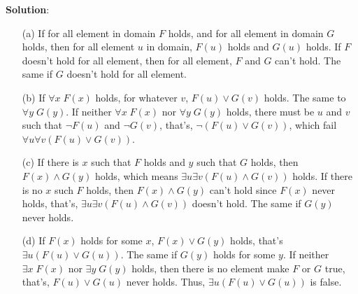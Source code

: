 \documentclass{ctexart}
\begin{document}
\textbf{Solution}:
\begin{itemize}

\item[(a)] If for all element in domain $F$ holds, and for all element in domain $G$ holds, then for all element $u$
in domain, $F(u)$ holds and $G(u)$ holds. If $F$ doesn't hold for all element,
then for all element, $F$ and $G$ can't hold. The same if $G$ doesn't hold for all element.

\item[(b)] If $\forall x\; F(x)$ holds, for whatever $v$, $F(u) \lor G(v)$ holds. The same to $\forall y\; G(y)$.
If neither $\forall x\; F(x)$ nor $\forall y\; G(y)$ holds, there must be $u$ and $v$ such that
$\lnot F(u)$ and $\lnot G(v)$, that's, $\lnot (F(u) \lor G(v))$, which fail $\forall u\forall v(F(u) \lor G(v))$.

\item[(c)] If there is $x$ such that $F$ holds and $y$ such that $G$ holds, then $F(x) \land G(y)$ holds, which means
$\exists u\exists v(F(u) \land G(v))$ holds. If there is no $x$ such $F$ holds, then $F(x) \land G(y)$ can't hold
since $F(x)$ never holds, that's, $\exists u\exists v(F(u) \land G(v))$ doesn't hold. The same if $G(y)$ never holds.

\item[(d)] If $F(x)$ holds for some $x$, $F(x) \lor G(y)$ holds, that's $\exists u(F(u) \lor G(u))$. The same if $G(y)$ holds
for some $y$. If neither $\exists x\; F(x)$ nor $\exists y\; G(y)$ holds, then there is no element make $F$ or $G$ true,
that's, $F(u) \lor G(u)$ never holds. Thus, $\exists u(F(u) \lor G(u))$ is false.

\end{itemize}
\end{document}
